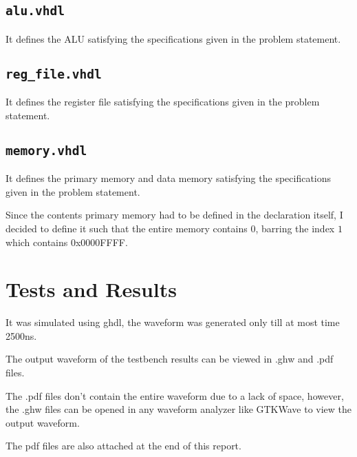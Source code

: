 \documentclass[a4paper]{scrartcl}
\theoremstyle{definition}
\renewcommand{\tt}{\texttt}
\begin{document}
\subsection*{\tt{alu.vhdl}}
It defines the ALU satisfying the specifications given in the problem statement.

\subsection*{\tt{reg_file.vhdl}}
It defines the register file satisfying the specifications given in the problem statement.

\subsection*{\tt{memory.vhdl}}
It defines the primary memory and data memory satisfying the specifications given in the problem statement.

Since the contents primary memory had to be defined in the declaration itself, I decided to define it such that the entire memory contains $0$, barring the index $1$ which contains 0x0000FFFF.

\section{Tests and Results}
It was simulated using ghdl, the waveform was generated only till at most time 2500ns.

The output waveform of the testbench results can be viewed in .ghw and .pdf files.

The .pdf files don't contain the entire waveform due to a lack of space, however, the .ghw files can be opened in any waveform analyzer like GTKWave to view the output waveform.

The pdf files are also attached at the end of this report.





\end{document}
